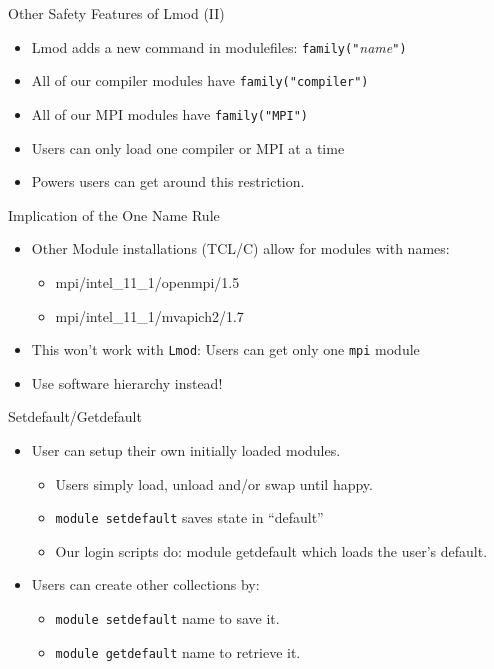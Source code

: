 \documentclass{beamer}
\begin{document}
\begin{frame}{Other Safety Features of Lmod (II)}
  \begin{itemize}
    \item Lmod adds a new command in modulefiles: \texttt{family("}\emph{name}\texttt{")}
    \item All of our compiler modules have \texttt{family("compiler")}
    \item All of our MPI modules have \texttt{family("MPI")}
    \item Users can only load one compiler or MPI at a time
    \item Powers users can get around this restriction.
  \end{itemize}
\end{frame}

\begin{frame}{Implication of the One Name Rule}
  \begin{itemize}
    \item Other Module installations (TCL/C) allow for modules with names:
      \begin{itemize}
        \item mpi/intel\_11\_1/openmpi/1.5
        \item mpi/intel\_11\_1/mvapich2/1.7
      \end{itemize}
    \item This won't work with \texttt{Lmod}: Users can get only one \texttt{mpi} module
    \item Use software hierarchy instead!
  \end{itemize}
\end{frame}

\begin{frame}{Setdefault/Getdefault}
  \begin{itemize}
    \item User can setup their own initially loaded modules.
      \begin{itemize}
        \item Users simply load, unload and/or swap until happy.
        \item {\color{blue}\texttt{module setdefault}} saves state in ``default''
        \item Our login scripts do: {\color{blue}module getdefault}
          which loads the user's default.
      \end{itemize}
    \item Users can create other collections by:
      \begin{itemize}
        \item {\color{blue}\texttt{module setdefault}
            {\color{violet}name}} to save it.
        \item {\color{blue}\texttt{module getdefault}
            {\color{violet}name}} to retrieve it.
      \end{itemize}
  \end{itemize}
\end{frame}
\end{document}
